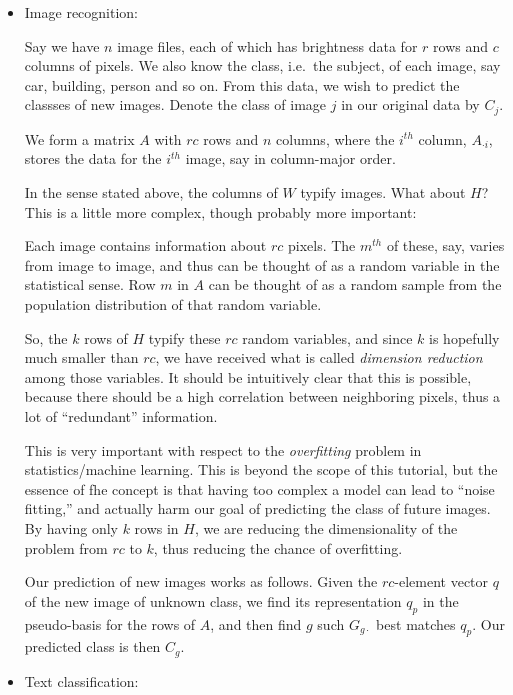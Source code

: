 \begin{itemize}

\item Image recognition:

Say we have $n$ image files, each of which has brightness data for
$r$ rows and $c$ columns of pixels.  We also know the class, i.e.\ 
the subject, of each image, say car, building, person and so on.
From this data, we wish to predict the classses of new images. Denote
the class of image $j$ in our original data by $C_j$.

We form a matrix $A$ with $rc$ rows and $n$ columns, where the $i^{th}$
column, $A_{\cdot i}$, stores the data for the $i^{th}$ image, say in
column-major order.  

In the sense stated above, the columns of $W$ typify images.  What about
$H$?  This is a little more complex, though probably more important:

Each image contains information about $rc$ pixels.  The $m^{th}$ of
these, say, varies from image to image, and thus can be thought of as a
random variable in the statistical sense.  Row $m$ in $A$ can be thought
of as a random sample from the population distribution of that random
variable.  

So, the $k$ rows of $H$ typify these $rc$ random variables, and since
$k$ is hopefully much smaller than $rc$, we have received what is called
{\it dimension reduction} among those variables.  It should be
intuitively clear that this is possible, because there should be a high
correlation between neighboring pixels, thus a lot of ``redundant''
information.

This is very important with respect to the {\it overfitting} problem in
statistics/machine learning.  This is beyond the scope of this tutorial,
but the essence of fhe concept is that having too complex a model can
lead to ``noise fitting,'' and actually harm our goal of predicting the
class of future images.  By having only $k$ rows in $H$, we are reducing
the dimensionality of the problem from $rc$ to $k$, thus reducing the
chance of overfitting.

Our prediction of new images works as follows.  Given the $rc$-element
vector $q$ of the new image of unknown class, we find its representation
$q_p$ in the pseudo-basis for the rows of $A$, and then find
$g$ such $G_{g \cdot}$ best matches $q_p$.  Our predicted class is then
$C_g$.

\item Text classification:


\end{itemize}
